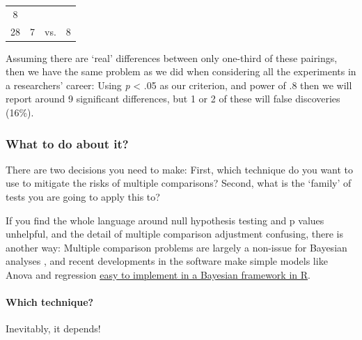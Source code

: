 \documentclass[]{article}
\let\oldparagraph\paragraph
\renewcommand{\paragraph}[1]{\oldparagraph{#1}\mbox{}}
\theoremstyle{definition}
\theoremstyle{definition}
\theoremstyle{definition}
\theoremstyle{remark}
\begin{document}
\begin{longtable}[]{@{}ccll@{}}
\begin{minipage}[t]{0.07\columnwidth}
8\strut
\end{minipage}\tabularnewline
\begin{minipage}[t]{0.16\columnwidth}\centering\strut
28\strut
\end{minipage} & \begin{minipage}[t]{0.10\columnwidth}\centering\strut
7\strut
\end{minipage} & \begin{minipage}[t]{0.07\columnwidth}\raggedright\strut
vs.\strut
\end{minipage} & \begin{minipage}[t]{0.07\columnwidth}\raggedright\strut
8\strut
\end{minipage}\tabularnewline
\bottomrule
\end{longtable}

Assuming there are `real' differences between only one-third of these
pairings, then we have the same problem as we did when considering all
the experiments in a researchers' career: Using \emph{p} \textless{} .05
as our criterion, and power of .8 then we will report around 9
significant differences, but 1 or 2 of these will false discoveries
(16\%).

\subsubsection*{What to do about it?}\label{what-to-do-about-it}

There are two decisions you need to make: First, which technique do you
want to use to mitigate the risks of multiple comparisons? Second, what
is the `family' of tests you are going to apply this to?

{If you find the whole language around null hypothesis testing and p
values unhelpful, and the detail of multiple comparison adjustment
confusing, there is another way: Multiple comparison problems are
largely a non-issue for Bayesian analyses \citep{gelman2012we}, and
recent developments in the software make simple models like Anova and
regression \protect\hyperlink{bayes-mcmc}{easy to implement in a
Bayesian framework in R}.}

\paragraph{Which technique?}\label{which-technique}

Inevitably, it depends!
\end{document}
